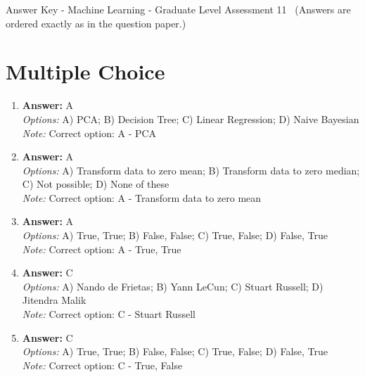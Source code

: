 \documentclass[12pt]{article}
\begin{document}
\begin{center}
Answer Key - Machine Learning - Graduate Level Assessment 11 \
\small (Answers are ordered exactly as in the question paper.)
\end{center}

\section*{Multiple Choice}
\begin{enumerate}[label=\arabic*.]
\item \textbf{Answer:} A
\\ \textit{Options:} A) PCA; B) Decision Tree; C) Linear Regression; D) Naive Bayesian
\\ \textit{Note:} Correct option: A - PCA
\item \textbf{Answer:} A
\\ \textit{Options:} A) Transform data to zero mean; B) Transform data to zero median; C) Not possible; D) None of these
\\ \textit{Note:} Correct option: A - Transform data to zero mean
\item \textbf{Answer:} A
\\ \textit{Options:} A) True, True; B) False, False; C) True, False; D) False, True
\\ \textit{Note:} Correct option: A - True, True
\item \textbf{Answer:} C
\\ \textit{Options:} A) Nando de Frietas; B) Yann LeCun; C) Stuart Russell; D) Jitendra Malik
\\ \textit{Note:} Correct option: C - Stuart Russell
\item \textbf{Answer:} C
\\ \textit{Options:} A) True, True; B) False, False; C) True, False; D) False, True
\\ \textit{Note:} Correct option: C - True, False
\end{enumerate}
\end{document}
